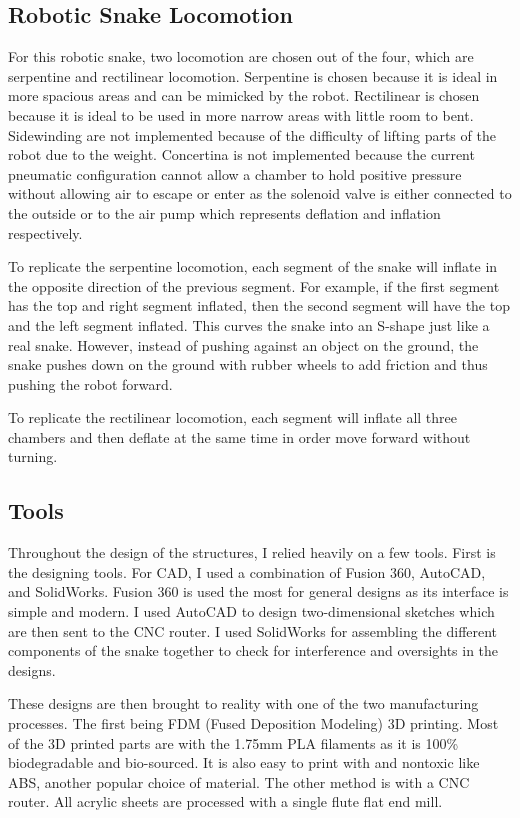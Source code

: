 \documentclass[twoside]{article}
\begin{document}
\subsection{Robotic Snake Locomotion}
For this robotic snake, two locomotion are chosen out of the four, which are serpentine and rectilinear locomotion. Serpentine is chosen because it is ideal in more spacious areas and can be mimicked by the robot. Rectilinear is chosen because it is ideal to be used in more narrow areas with little room to bent. Sidewinding are not implemented because of the difficulty of lifting parts of the robot due to the weight. Concertina is not implemented because the current pneumatic configuration cannot allow a chamber to hold positive pressure without allowing air to escape or enter as the solenoid valve is either connected to the outside or to the air pump which represents deflation and inflation respectively. 

To replicate the serpentine locomotion, each segment of the snake will inflate in the opposite direction of the previous segment. For example, if the first segment has the top and right segment inflated, then the second segment will have the top and the left segment  inflated. This curves the snake into an S-shape just like a real snake. However, instead of pushing against an object on the ground, the snake pushes down on the ground with rubber wheels to add friction and thus pushing the robot forward. 

To replicate the rectilinear locomotion, each segment will inflate all three chambers and then deflate at the same time in order move forward without turning.

\subsection{Tools}
Throughout the design of the structures, I relied heavily on a few tools. First is the designing tools. For CAD, I used a combination of Fusion 360, AutoCAD, and SolidWorks. Fusion 360 is used the most for general designs as its interface is simple and modern. I used AutoCAD to design two-dimensional sketches which are then sent to the CNC router. I used SolidWorks for assembling the different components of the snake together to check for interference and oversights in the designs. 

These designs are then brought to reality with one of the two manufacturing processes. The first being FDM (Fused Deposition Modeling) 3D printing. Most of the 3D printed parts are with the 1.75mm PLA filaments as it is 100\% biodegradable and bio-sourced. It is also easy to print with and nontoxic like ABS, another popular choice of material. The other method is with a CNC router. All acrylic sheets are processed with a single flute flat end mill.
\end{document}

